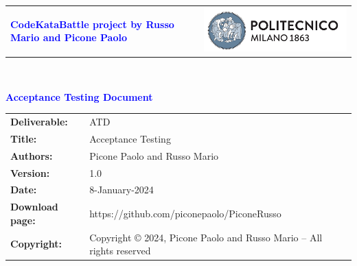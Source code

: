 




\begin{titlepage}


{\begin{table}[t!]
\centering
\begin{tabu} to \textwidth { X[1.3,r,p] X[1.7,l,p] }
\textcolor{Blue}
{\textbf{\small{CodeKataBattle project by Russo Mario and Picone Paolo}}} & \includegraphics[scale=0.5]{Images/PolimiLogo}
\end{tabu}
\end{table}}~\\ [7cm]


\begin{flushleft}

{\textcolor{Blue}{\textbf{\Huge{Acceptance Testing Document}}}} \\ [1cm]

\end{flushleft}

\end{titlepage}

\begin{table}[h!]
\begin{tabu} to \textwidth { X[0.3,r,p] X[0.7,l,p] }
\hline

\textbf{Deliverable:} & ATD\\
\textbf{Title:} & Acceptance Testing \\
\textbf{Authors:} & Picone Paolo and Russo Mario\\
\textbf{Version:} & 1.0 \\ 
\textbf{Date:} & 8-January-2024 \\
\textbf{Download page:} & https://github.com/piconepaolo/PiconeRusso \\
\textbf{Copyright:} & Copyright © 2024, Picone Paolo and Russo Mario – All rights reserved \\
\hline
\end{tabu}
\end{table}




